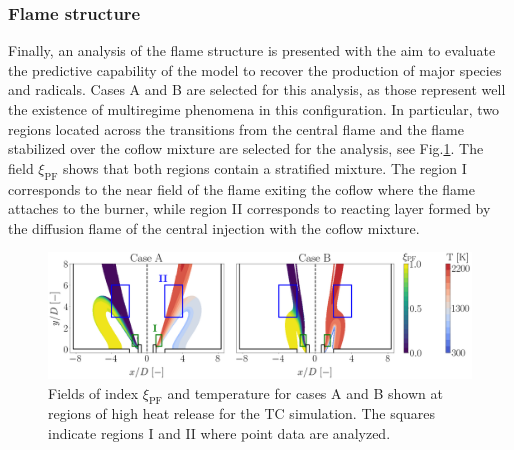 \documentclass[preprint,12pt,authoryear]{elsarticle}
\begin{document}
{\subsubsection{Flame structure}

Finally, an analysis of the flame structure is presented with the aim to evaluate the predictive capability of the model to recover the production of major species and radicals. Cases A and B are selected for this analysis, as those represent well the existence of multiregime phenomena in this configuration. In particular, two regions located across the transitions from the central flame and the flame stabilized over the coflow mixture are selected for the analysis, see Fig.\ref{fig:fts_scatterplots_maps_regions}. The field $\xi_\mathrm{PF}$ shows that both regions contain a stratified mixture. The region I corresponds to the near field of the flame exiting the coflow where the flame attaches to the burner, while region II corresponds to reacting layer formed by the diffusion flame of the central injection with the coflow mixture. 


\begin{figure}[h!]
    \centering
	\includegraphics[scale=0.225]{./figures/fts_scatterplots_maps_regions}
	\caption{Fields of index $\xi_\mathrm{PF}$ and temperature for cases A and B shown at regions of high heat release for the TC simulation. The squares indicate regions I and II where point data are analyzed.}
	\label{fig:fts_scatterplots_maps_regions}
\end{figure}

}
\end{document}
